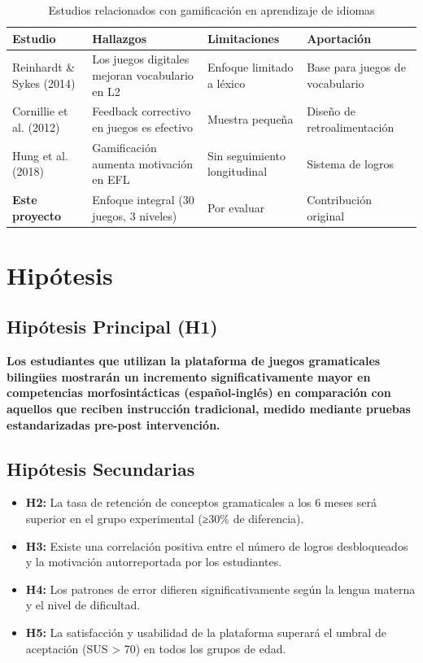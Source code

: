 \documentclass[12pt,a4paper]{article}
\begin{document}
\begin{table}[H]
\centering
\caption{Estudios relacionados con gamificación en aprendizaje de idiomas}
\begin{tabular}{|p{3cm}|p{4cm}|p{3cm}|p{3cm}|}
\hline
\textbf{Estudio} & \textbf{Hallazgos} & \textbf{Limitaciones} & \textbf{Aportación} \\
\hline
Reinhardt \& Sykes (2014) & Los juegos digitales mejoran vocabulario en L2 & Enfoque limitado a léxico & Base para juegos de vocabulario \\
\hline
Cornillie et al. (2012) & Feedback correctivo en juegos es efectivo & Muestra pequeña & Diseño de retroalimentación \\
\hline
Hung et al. (2018) & Gamificación aumenta motivación en EFL & Sin seguimiento longitudinal & Sistema de logros \\
\hline
\textbf{Este proyecto} & Enfoque integral (30 juegos, 3 niveles) & Por evaluar & Contribución original \\
\hline
\end{tabular}
\end{table}

\section{Hipótesis}

\subsection{Hipótesis Principal (H1)}

\textbf{Los estudiantes que utilizan la plataforma de juegos gramaticales bilingües mostrarán un incremento significativamente mayor en competencias morfosintácticas (español-inglés) en comparación con aquellos que reciben instrucción tradicional, medido mediante pruebas estandarizadas pre-post intervención.}

\subsection{Hipótesis Secundarias}

\begin{itemize}
    \item \textbf{H2:} La tasa de retención de conceptos gramaticales a los 6 meses será superior en el grupo experimental (≥30\% de diferencia).
    
    \item \textbf{H3:} Existe una correlación positiva entre el número de logros desbloqueados y la motivación autorreportada por los estudiantes.
    
    \item \textbf{H4:} Los patrones de error difieren significativamente según la lengua materna y el nivel de dificultad.
    
    \item \textbf{H5:} La satisfacción y usabilidad de la plataforma superará el umbral de aceptación (SUS > 70) en todos los grupos de edad.
\end{itemize}
\end{document}
